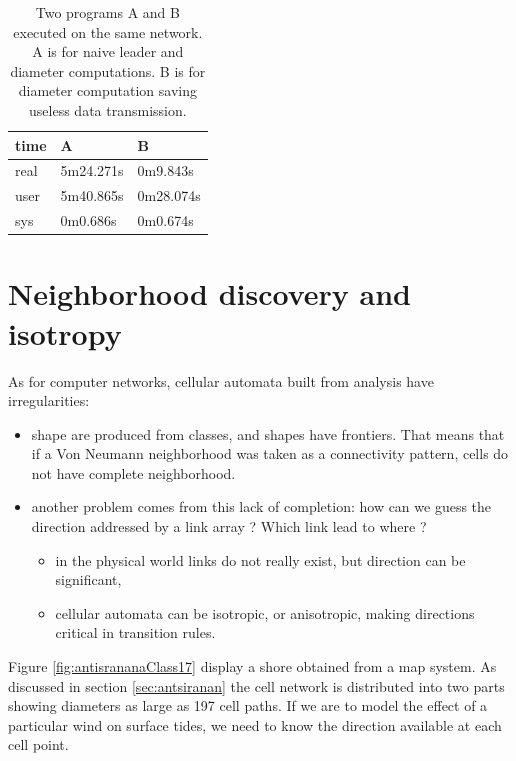 \begin{table}[htb]
\begin{center}
\begin{tabular}{|l|l|l|}\hline 
time &  A & B \\\hline
real &  5m24.271s &     0m9.843s\\\hline
user &  5m40.865s &     0m28.074s\\\hline
sys  &  0m0.686s  &     0m0.674s\\\hline
\end{tabular}
\caption{ Two programs A and B executed on the same network. A is for naive
leader and diameter computations. B is for diameter computation saving useless
data transmission. }
\label{tab:uneTableBench}
\end{center}
\end{table}

\section{Neighborhood discovery and isotropy}

As for computer networks,  cellular automata built from analysis have irregularities:

\begin{itemize}
\item shape are  produced from classes, and shapes have frontiers. That means that
if a Von Neumann neighborhood was taken as a connectivity pattern, cells do not have
complete neighborhood.
\item another problem comes from this lack of completion: how can we guess the direction addressed
by a link array ? Which link lead to where ?
\begin{itemize}
\item in the physical world links do not really exist, but direction can be significant,
\item cellular automata can be isotropic, or anisotropic, making directions critical
in transition rules.
\end{itemize}
\end{itemize}




Figure \ref{fig:antisrananaClass17} display a shore obtained from a map system.
As discussed in section \ref{sec:antsiranan} the cell network is distributed into
two parts showing diameters as large as 197 cell paths. If we are to model the effect
of a particular wind on surface tides, we need to know the direction available at each
cell point.

